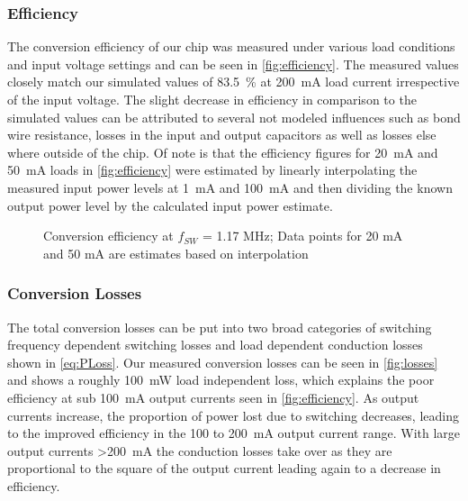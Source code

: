 \subsubsection{Efficiency}
\label{sec:efficiency}

The conversion efficiency of our chip was measured under various load conditions and input voltage settings and can be seen in \autoref{fig:efficiency}. The measured values closely match our simulated values of \qty{83.5}{\percent} at \qty{200}{\milli\ampere} load current irrespective of the input voltage. The slight decrease in efficiency in comparison to the simulated values can be attributed to several not modeled influences such as bond wire resistance, losses in the input and output capacitors as well as losses else where outside of the chip. Of note is that the efficiency figures for \qty{20}{\milli\ampere} and \qty{50}{\milli\ampere} loads in \autoref{fig:efficiency} were estimated by linearly interpolating the measured input power levels at \qty{1}{\milli\ampere} and \qty{100}{\milli\ampere} and then dividing the known output power level by the calculated input power estimate.
\begin{figure}[h]
    \centering
    
    \caption{Conversion efficiency at $f_{SW}$ = 1.17 MHz; Data points for 20 mA and 50 mA are estimates based on interpolation}
    \label{fig:efficiency}
\end{figure}
\clearpage
\subsubsection{Conversion Losses}
\label{sec:losses}
The total conversion losses can be put into two broad categories of switching frequency dependent switching losses and load dependent conduction losses shown in \autoref{eq:PLoss}. Our measured conversion losses can be seen in \autoref{fig:losses} and shows a roughly \qty{100}{\milli\watt} load independent loss, which explains the poor efficiency at sub \qty{100}{\milli\ampere} output currents seen in \autoref{fig:efficiency}. As output currents increase, the proportion of power lost due to switching decreases, leading to the improved efficiency in the 100 to \qty{200}{\milli\ampere} output current range. With large output currents >\qty{200}{\milli\ampere} the conduction losses take over as they are proportional to the square of the output current leading again to a decrease in efficiency.

